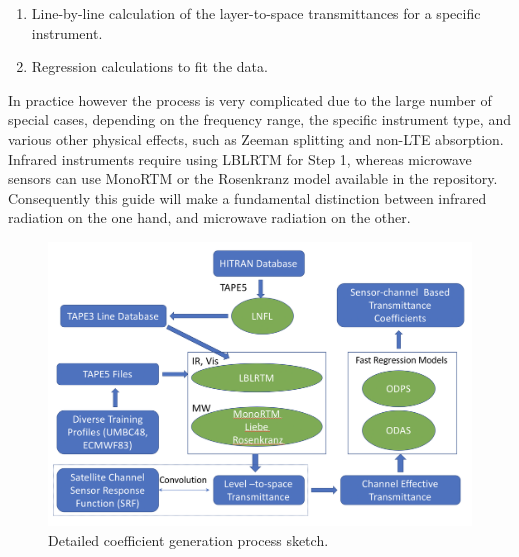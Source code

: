 \begin{enumerate}
\item Line-by-line calculation of the layer-to-space transmittances for a specific instrument.
\item Regression calculations to fit the data.
\end{enumerate}
 
In practice however the process is very complicated due to the large number of special cases, depending on the frequency range, the specific instrument type, and various other physical effects, such as Zeeman splitting and non-LTE absorption.
Infrared instruments require using LBLRTM for Step 1, whereas microwave sensors can use MonoRTM or the Rosenkranz model available in the repository.
Consequently this guide will make a fundamental distinction between infrared radiation on the one hand, and microwave radiation on the other.
 \begin{figure}[H]
 \centering
 \includegraphics[width=1.\textwidth]{graphics/process_overview_2}
 \caption{Detailed coefficient generation process sketch.}
 \label{fig:proc2}
 \end{figure}

